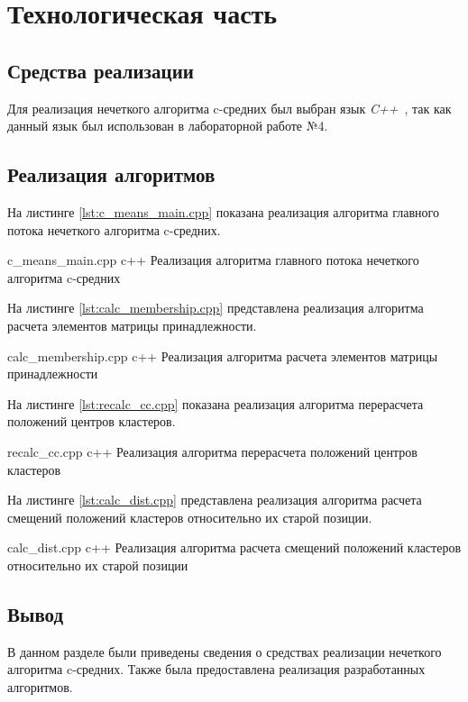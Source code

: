 \chapter{Технологическая часть}

\section{Средства реализации}

Для реализация нечеткого алгоритма c-средних был выбран язык \textit{C++}~\cite{cpp-lang}, так как данный язык был использован в лабораторной работе №4.

\section{Реализация алгоритмов}

На листинге \ref{lst:c_means_main.cpp} показана реализация алгоритма главного потока нечеткого алгоритма c-средних.

	{c_means_main.cpp}
	{c++}
	{Реализация алгоритма главного потока нечеткого алгоритма c-средних}

На листинге \ref{lst:calc_membership.cpp} представлена реализация алгоритма расчета элементов матрицы принадлежности.
	
	{calc_membership.cpp}
	{c++}
	{Реализация алгоритма расчета элементов матрицы принадлежности}

На листинге \ref{lst:recalc_cc.cpp} показана реализация алгоритма перерасчета положений центров кластеров.

	{recalc_cc.cpp}
	{c++}
	{Реализация алгоритма перерасчета положений центров кластеров}

На листинге \ref{lst:calc_dist.cpp} представлена реализация алгоритма расчета смещений положений кластеров относительно их старой позиции.

	{calc_dist.cpp}
	{c++}
	{Реализация алгоритма расчета смещений положений кластеров относительно их старой позиции}

\section*{Вывод}

В данном разделе были приведены сведения о средствах реализации нечеткого алгоритма c-средних.
Также была предоставлена реализация разработанных алгоритмов.